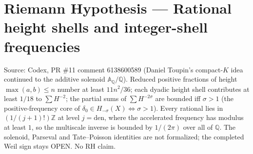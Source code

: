 \documentclass{report}
\theoremstyle{definition}
\begin{document}
\section{Riemann Hypothesis --- Rational height shells and integer-shell frequencies}
Source: Codex, PR \#11 comment 6138600589 (Daniel Toupin's compact-$K$ idea continued to the additive solenoid $\mathbb{A}_\mathbb{Q}/\mathbb{Q}$). Reduced positive fractions of height $\max(a,b)\le n$ number at least $11n^2/36$; each dyadic height shell contributes at least $1/18$ to $\sum H^{-2}$; the partial sums of $\sum H^{-2\sigma}$ are bounded iff $\sigma>1$ (the positive-frequency core of $\delta_0\in H_{-\sigma}(X)\iff\sigma>1$). Every rational lies in $(1/(j+1)!)\mathbb{Z}$ at level $j=\mathrm{den}$, where the accelerated frequency has modulus at least $1$, so the multiscale inverse is bounded by $1/(2\pi)$ over all of $\mathbb{Q}$. The solenoid, Parseval and Tate--Poisson identities are not formalized; the completed Weil sign stays OPEN. No RH claim.
\end{document}
